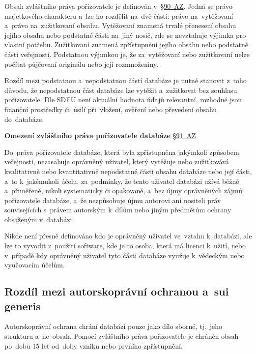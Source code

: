 Obsah zvláštního práva pořizovatele je definován v~\href{https://www.zakonyprolidi.cz/cs/2000-121#p90}{§90~AZ}. Jedná se právo majetkového charakteru a~lze ho rozdělit na~dvě části: právo na~vytěžovaní a~právo na~zužitkovaní obsahu. Vytěžovaní znamená trvalé přenesení obsahu jejího obsahu nebo podstatné části na~jiný nosič, zde se nevztahuje výjimka pro vlastní potřebu. Zužitkovaní znamená zpřístupnění jejího obsahu nebo podstatné části veřejnosti. Podstatnou výjimkou je, že za~vytěžovaní nebo zužitkovaní nelze počítat půjčovaní originálu nebo její rozmnoženiny.

Rozdíl mezi podstatnou a~nepodstatnou částí databáze je nutné stanovit z~toho důvodu, že nepodstatnou část databáze lze vytěžit a~zužitkovat bez souhlasu pořizovatele. Dle SDEU není aktuální hodnota údajů relevantní, rozhodné jsou finanční prostředky či~úsilí při~vložení, ověření nebo převedení obsahu do~databáze.

\textbf{Omezení zvláštního práva pořizovatele databáze} \href{https://www.zakonyprolidi.cz/cs/2000-121#p91}{§91~AZ}

Do~práva pořizovatele databáze, která byla zpřístupněna jakýmkoli způsobem veřejnosti, nezasahuje oprávněný uživatel, který vytěžuje nebo zužitkovává kvalitativně nebo kvantitativně nepodstatné části obsahu databáze nebo její části, a~to k~jakémukoli účelu, za~podmínky, že tento uživatel databázi užívá běžně a~přiměřeně, nikoli systematicky či opakovaně, a~bez újmy oprávněných zájmů pořizovatele databáze, a~že nezpůsobuje újmu autorovi ani nositeli práv souvisejících s~právem autorským k~dílům nebo jiným předmětům ochrany obsaženým v~databázi.

Nikde není přesně definováno kdo je oprávněný uživatel ve~vztahu k~databázi, ale lze to vyvodit z~použití software, kde je to osoba, která má licenci k~užití, nebo v~případě kdy oprávněný uživatel tyto části databáze využije k~vědeckým nebo vyučovacím účelům.

\subsection{Rozdíl mezi autorskoprávní ochranou a~sui generis}

Autorskoprávní ochrana chrání databázi pouze jako dílo sborné, tj.~jeho strukturu a~ne~obsah. Pomocí zvláštního práva pořizovatele je chráněn obsah po~dobu 15 let od~doby vzniku nebo prvního zpřístupnění.

